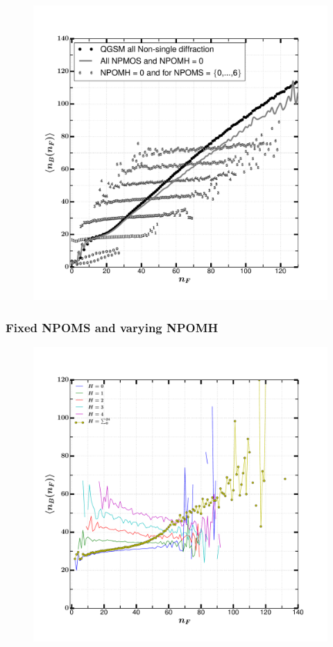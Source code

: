 \documentclass[]{article}
\begin{document}
\begin{figure}[h!]
    \centering
\includegraphics[scale=0.5]{../analyzed/nsd_nbnf_allnpoms_0npomh.pdf}
    \caption[NSD N NPOMS and all NPOMH]{}
\end{figure}

\newpage
\subsubsection*{\centering Fixed NPOMS and varying NPOMH}

\begin{figure}[h!]
    \centering
    \includegraphics[scale=0.5]{../analyzed/nsd_nbnf_fixed_s_var_h.pdf}
    \caption[NSD Fixed NPOMS and varying NPOMH]{}
\end{figure}
\end{document}
